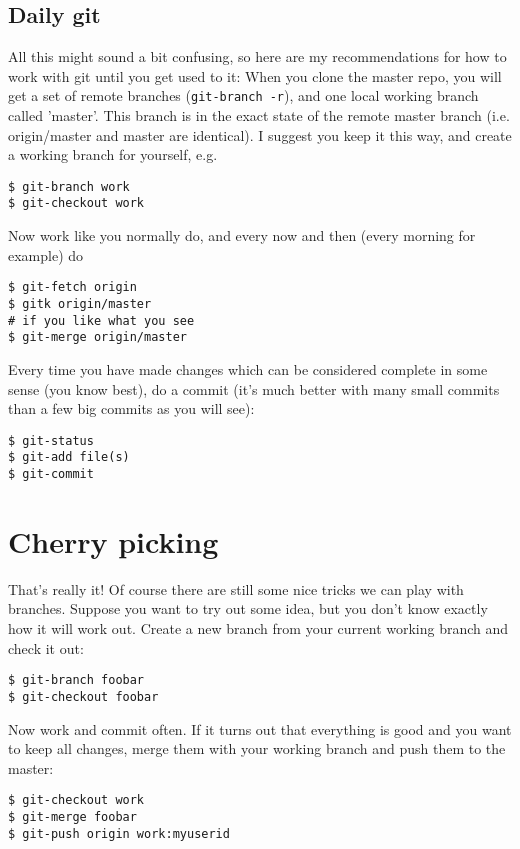 \documentclass[a4paper,10pt]{article}
\begin{document}
\subsection{Daily git}
All this might sound a bit confusing, so here are my recommendations for
how to work with git until you get used to it:
When you clone the master repo, you will get a set of remote branches
(\texttt{git-branch -r}), and one local working branch called 'master'. This branch is
in the exact state of the remote master branch (i.e. origin/master and master
are identical). I suggest you keep it this way, and create a working branch
for yourself, e.g. 

\begin{verbatim}
$ git-branch work
$ git-checkout work 
\end{verbatim}

Now work like you normally do, and every now and then (every morning for
example) do

\begin{verbatim}
$ git-fetch origin
$ gitk origin/master
# if you like what you see
$ git-merge origin/master 
\end{verbatim}

Every time you have made changes which can be considered complete in some
sense (you know best), do a commit (it's much better with many small commits
than a few big commits as you will see):

\begin{verbatim}
$ git-status
$ git-add file(s)
$ git-commit 
\end{verbatim}

\section{Cherry picking}
That's really it! Of course there are still some nice tricks we can play with
branches. Suppose you want to try out some idea, but you don't know exactly
how it will work out. Create a new branch from your current working branch and
check it out:

\begin{verbatim}
$ git-branch foobar
$ git-checkout foobar
\end{verbatim}

Now work and commit often. If it turns out that everything is good and you
want to keep all changes, merge them with your working branch and push them to
the master:

\begin{verbatim}
$ git-checkout work
$ git-merge foobar
$ git-push origin work:myuserid
\end{verbatim}
\end{document}
